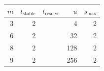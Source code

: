 \begin{tabular}{rrrrr}%
\hline%
$m$&$t_{\mathrm{stable}}$&$t_{\mathrm{resolve}}$&$u$&$s_{\max}$\\%
\hline%
3&2&&4&2\\%
6&2&&32&2\\%
8&2&&128&2\\%
9&2&&256&2\\%
\hline%
\end{tabular}
